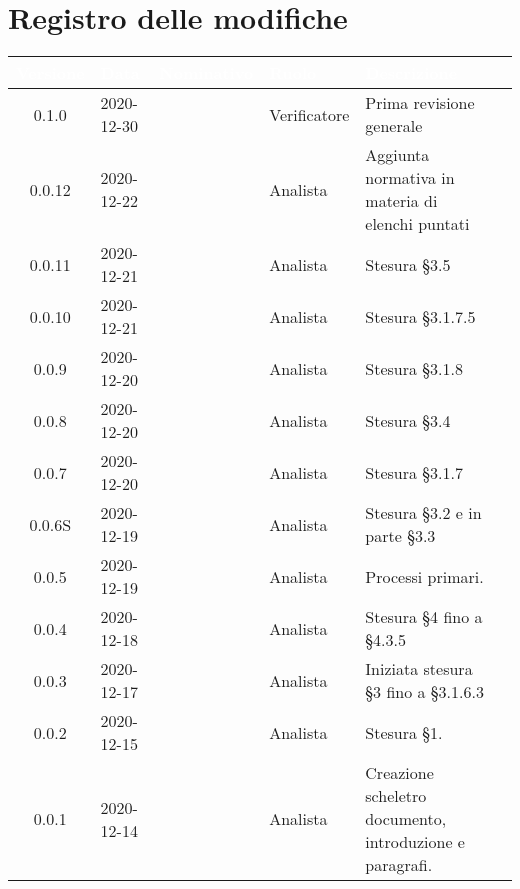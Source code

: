 \section*{Registro delle modifiche}
\setcounter{table}{-1}
{

\renewcommand{\arraystretch}{1.5}
\centering
\begin{longtable}{c C{2.6cm} C{2.6cm} C{2.6cm} C{2.6cm} C{3.5cm}}
\textcolor{white}{\textbf{Versione}}&
\textcolor{white}{\textbf{Data}}&
\textcolor{white}{\textbf{Nominativo}}&
\textcolor{white}{\textbf{Ruolo}}&
\textcolor{white}{\textbf{Descrizione}}\\	
\endhead

0.1.0 & 2020-12-30 & \SP{} & Verificatore & Prima revisione generale\\
0.0.12 & 2020-12-22 & \PA{} & Analista & Aggiunta normativa in materia di elenchi puntati \\
0.0.11 & 2020-12-21 & \RA{} & Analista & Stesura \S 3.5 \\
0.0.10 & 2020-12-21 & \PA{} & Analista & Stesura \S 3.1.7.5 \\
0.0.9 & 2020-12-20 & \PA{} & Analista & Stesura \S 3.1.8 \\
0.0.8 & 2020-12-20 & \RA{} & Analista & Stesura \S 3.4 \\
0.0.7 & 2020-12-20 & \PA{} & Analista & Stesura \S 3.1.7 \\
0.0.6S & 2020-12-19 & \RA{} & Analista & Stesura \S 3.2 e in parte \S 3.3 \\
0.0.5 & 2020-12-19 & \ZM{} & Analista & Processi primari. \\
0.0.4 & 2020-12-18 & \SH{} & Analista & Stesura \S 4 fino a \S 4.3.5\\
0.0.3 & 2020-12-17 & \PA{} & Analista & Iniziata stesura \S 3 fino a \S 3.1.6.3 \\
0.0.2 & 2020-12-15 & \PA{} & Analista & Stesura \S 1. \\
0.0.1 & 2020-12-14 & \ZM{} & Analista & Creazione scheletro documento, introduzione e paragrafi. \\
		
\end{longtable}
}
